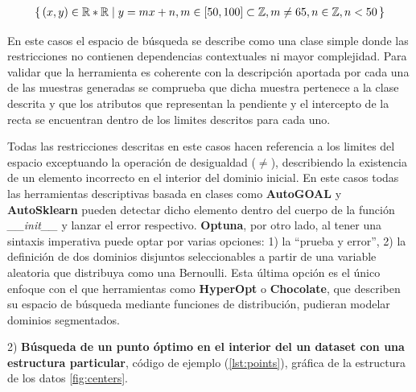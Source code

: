 \begin{align*}
      \{\,(x, y) \in \mathbb{R} * \mathbb{R}\mid y = mx + n,
      \space m \in [50, 100] \subset \mathbb{Z},\space m \neq 65,
      \space n \in \mathbb{Z},\space n < 50\,\} \\
\end{align*}

En este casos el espacio de búsqueda se describe como una clase simple donde las restricciones
no contienen dependencias contextuales ni mayor complejidad. Para validar que la herramienta es
coherente con la descripción aportada por cada una de las muestras generadas se comprueba que dicha
muestra pertenece a la clase descrita y que los atributos que representan la pendiente y el intercepto
de la recta se encuentran dentro de los limites descritos para cada uno.

Todas las restricciones descritas en este casos hacen referencia a los limites del espacio exceptuando
la operación de desigualdad ($\neq$), describiendo la existencia de un elemento incorrecto en el interior del
dominio inicial. En este casos todas las herramientas descriptivas basada en clases como {\bf AutoGOAL} y
      {\bf AutoSklearn} pueden detectar dicho elemento dentro del cuerpo de la función {\it \_\_init\_\_} y lanzar el error
respectivo. {\bf Optuna}, por otro lado, al tener una sintaxis imperativa puede optar por varias opciones:
1) la ``prueba y error'', 2) la definición de dos dominios disjuntos seleccionables a partir de
una variable aleatoria que distribuya como una Bernoulli. Esta última opción es el único enfoque con el 
que herramientas como {\bf HyperOpt} o {\bf Chocolate}, que describen su espacio de búsqueda mediante funciones de
distribución, pudieran modelar dominios segmentados.


2) {\bf Búsqueda de un punto óptimo en el interior del un dataset con una estructura particular}, 
código de ejemplo (\ref{lst:points}), gráfica de la estructura de los datos \ref{fig:centers}. 

